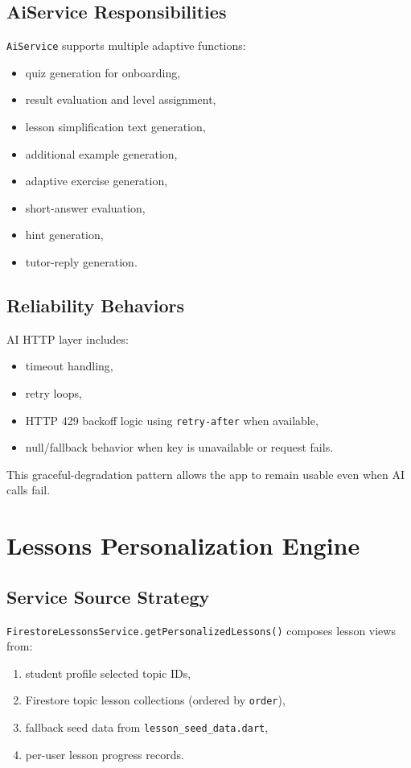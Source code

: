 \documentclass[11pt,a4paper]{article}
\begin{document}
\subsection{AiService Responsibilities}
\texttt{AiService} supports multiple adaptive functions:
\begin{itemize}
  \item quiz generation for onboarding,
  \item result evaluation and level assignment,
  \item lesson simplification text generation,
  \item additional example generation,
  \item adaptive exercise generation,
  \item short-answer evaluation,
  \item hint generation,
  \item tutor-reply generation.
\end{itemize}

\subsection{Reliability Behaviors}
AI HTTP layer includes:
\begin{itemize}
  \item timeout handling,
  \item retry loops,
  \item HTTP 429 backoff logic using \texttt{retry-after} when available,
  \item null/fallback behavior when key is unavailable or request fails.
\end{itemize}

This graceful-degradation pattern allows the app to remain usable even when AI calls fail.

\section{Lessons Personalization Engine}
\subsection{Service Source Strategy}
\texttt{FirestoreLessonsService.getPersonalizedLessons()} composes lesson views from:
\begin{enumerate}
  \item student profile selected topic IDs,
  \item Firestore topic lesson collections (ordered by \texttt{order}),
  \item fallback seed data from \texttt{lesson\_seed\_data.dart},
  \item per-user lesson progress records.
\end{enumerate}
\end{document}
